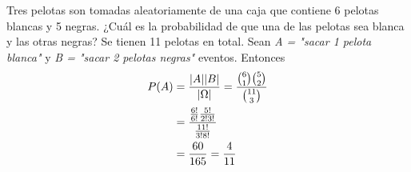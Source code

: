  {
  Tres pelotas son tomadas aleatoriamente de una caja que contiene 6 pelotas blancas y 5 negras. ¿Cuál es la probabilidad de que una de las pelotas sea blanca y las otras negras?
  \newpara
  Se tienen 11 pelotas en total. Sean \textit{A = "sacar 1 pelota blanca"} y \textit{B = "sacar 2 pelotas negras"} eventos.
  Entonces 
  \begin{align*}
    P(A) &= \frac{\abs*{A} \abs*{B}}{\abs*{\Omega}} = \frac{ \binom61 \binom52} {\binom{11}3} \\ 
        &= \frac{ \frac{6!}{6!} \frac{5!}{2! 3!} } { \frac{11!}{3!8!} } \\ 
        &= \frac{60} {165} = \frac{4}{11}
  \end{align*}
}

